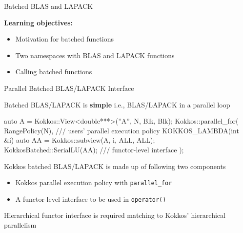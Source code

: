 \begin{frame}[fragile]

  {\Huge Batched BLAS and LAPACK}

  \vspace{20pt}

  \textbf{Learning objectives:}
  \begin{itemize}
    \item {Motivation for batched functions}
    \item {Two namespaces with BLAS and LAPACK functions}
    \item {Calling batched functions}
  \end{itemize}

  \vspace{-20pt}

\end{frame}

\begin{frame}[fragile]{Parallel Batched BLAS/LAPACK Interface}

Batched BLAS/LAPACK is {\bf simple} i.e., BLAS/LAPACK in a parallel loop

  \begin{code}[frame=single, keywords={}, backgroundcolor=\color{brown!10}, basicstyle=\tiny]
auto A = Kokkos::View<double***>(''A'', N, Blk, Blk);
Kokkos::parallel_for( RangePolicy(N), /// users' parallel execution policy
  KOKKOS_LAMBDA(int &i) {
  auto AA = Kokkos::subview(A, i, ALL, ALL);
  KokkosBatched::SerialLU(AA);  /// functor-level interface
});
  \end{code}
\vspace{1pt}
Kokkos batched BLAS/LAPACK is made up of following two components
\begin{itemize}
\item Kokkos parallel execution policy with \verb|parallel_for|
\item A functor-level interface to be used in \verb|operator()|
\end{itemize}
\vspace{1pt}
Hierarchical functor interface is required matching to Kokkos' hierarchical parallelism

\end{frame}
  
